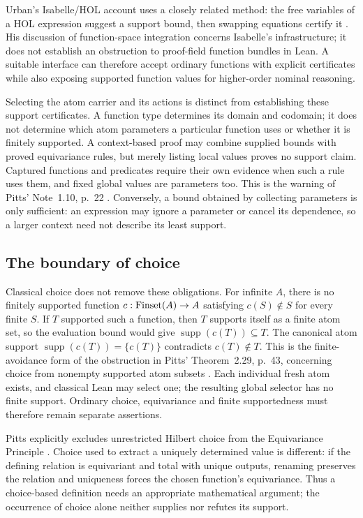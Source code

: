 Urban's Isabelle/HOL account uses a closely related method: the free
variables of a HOL expression suggest a support bound, then swapping
equations certify it \cite[Section~5, Definition~5, Lemma~11 and
Examples~1--2]{urban2008}. His discussion of function-space integration
concerns Isabelle's infrastructure; it does not establish an obstruction
to proof-field function bundles in Lean. A suitable interface can therefore
accept ordinary functions with explicit certificates while also exposing
supported function values for higher-order nominal reasoning.

Selecting the atom carrier and its actions is distinct from establishing
these support certificates. A function type determines its domain and
codomain; it does not determine which atom parameters a particular function
uses or whether it is finitely supported. A context-based proof may combine
supplied bounds with proved equivariance rules, but merely listing local
values proves no support claim. Captured functions and predicates require
their own evidence when such a rule uses them, and fixed global values
are parameters too. This is the warning of Pitts' Note~1.10, p.~22
\cite{pitts2013}. Conversely, a bound obtained by collecting parameters
is only sufficient: an expression may ignore a parameter or cancel its
dependence, so a larger context need not describe its least support.

\subsection{The boundary of choice}
\label{sec:function-choice}

Classical choice does not remove these obligations. For infinite $A$,
there is no finitely supported function
$c:\operatorname{Finset}(A)\to A$ satisfying $c(S)\notin S$ for every finite $S$.
If $T$ supported such a function, then $T$ supports itself as a finite
atom set, so the evaluation bound would give
$\operatorname{supp}(c(T))\subseteq T$. The canonical atom support
$\operatorname{supp}(c(T))=\{c(T)\}$ contradicts $c(T)\notin T$.
This is the finite-avoidance form of the obstruction in Pitts'
Theorem~2.29, p.~43, concerning choice from nonempty supported atom subsets
\cite{pitts2013}. Each individual fresh atom exists, and classical Lean
may select one; the resulting global selector has no finite support.
Ordinary choice, equivariance and finite supportedness must therefore
remain separate assertions.

Pitts explicitly excludes unrestricted Hilbert choice from the
Equivariance Principle \cite[Note~1.11, p.~22]{pitts2013}. Choice used
to extract a uniquely determined value is different: if the defining
relation is equivariant and total with unique outputs, renaming preserves
the relation and uniqueness forces the chosen function's equivariance.
Thus a choice-based definition needs an appropriate mathematical argument;
the occurrence of choice alone neither supplies nor refutes its support.
